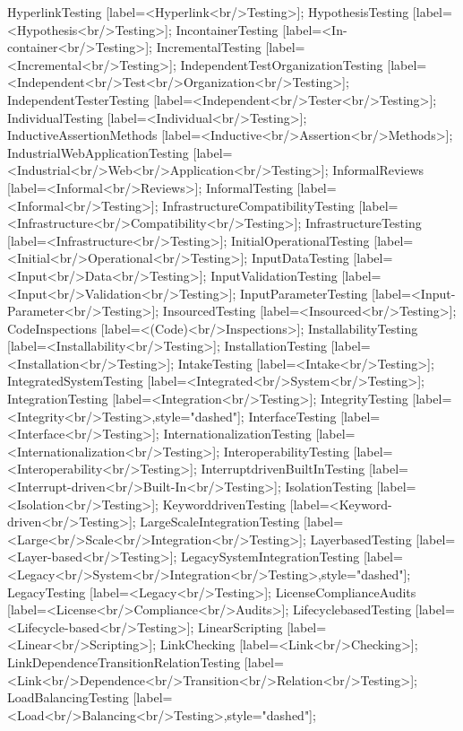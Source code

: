 \documentclass{article}
\begin{document}
{HyperlinkTesting [label=<Hyperlink<br/>Testing>];
HypothesisTesting [label=<Hypothesis<br/>Testing>];
IncontainerTesting [label=<In-container<br/>Testing>];
IncrementalTesting [label=<Incremental<br/>Testing>];
IndependentTestOrganizationTesting [label=<Independent<br/>Test<br/>Organization<br/>Testing>];
IndependentTesterTesting [label=<Independent<br/>Tester<br/>Testing>];
IndividualTesting [label=<Individual<br/>Testing>];
InductiveAssertionMethods [label=<Inductive<br/>Assertion<br/>Methods>];
IndustrialWebApplicationTesting [label=<Industrial<br/>Web<br/>Application<br/>Testing>];
InformalReviews [label=<Informal<br/>Reviews>];
InformalTesting [label=<Informal<br/>Testing>];
InfrastructureCompatibilityTesting [label=<Infrastructure<br/>Compatibility<br/>Testing>];
InfrastructureTesting [label=<Infrastructure<br/>Testing>];
InitialOperationalTesting [label=<Initial<br/>Operational<br/>Testing>];
InputDataTesting [label=<Input<br/>Data<br/>Testing>];
InputValidationTesting [label=<Input<br/>Validation<br/>Testing>];
InputParameterTesting [label=<Input-Parameter<br/>Testing>];
InsourcedTesting [label=<Insourced<br/>Testing>];
CodeInspections [label=<(Code)<br/>Inspections>];
InstallabilityTesting [label=<Installability<br/>Testing>];
InstallationTesting [label=<Installation<br/>Testing>];
IntakeTesting [label=<Intake<br/>Testing>];
IntegratedSystemTesting [label=<Integrated<br/>System<br/>Testing>];
IntegrationTesting [label=<Integration<br/>Testing>];
IntegrityTesting [label=<Integrity<br/>Testing>,style="dashed"];
InterfaceTesting [label=<Interface<br/>Testing>];
InternationalizationTesting [label=<Internationalization<br/>Testing>];
InteroperabilityTesting [label=<Interoperability<br/>Testing>];
InterruptdrivenBuiltInTesting [label=<Interrupt-driven<br/>Built-In<br/>Testing>];
IsolationTesting [label=<Isolation<br/>Testing>];
KeyworddrivenTesting [label=<Keyword-driven<br/>Testing>];
LargeScaleIntegrationTesting [label=<Large<br/>Scale<br/>Integration<br/>Testing>];
LayerbasedTesting [label=<Layer-based<br/>Testing>];
LegacySystemIntegrationTesting [label=<Legacy<br/>System<br/>Integration<br/>Testing>,style="dashed"];
LegacyTesting [label=<Legacy<br/>Testing>];
LicenseComplianceAudits [label=<License<br/>Compliance<br/>Audits>];
LifecyclebasedTesting [label=<Lifecycle-based<br/>Testing>];
LinearScripting [label=<Linear<br/>Scripting>];
LinkChecking [label=<Link<br/>Checking>];
LinkDependenceTransitionRelationTesting [label=<Link<br/>Dependence<br/>Transition<br/>Relation<br/>Testing>];
LoadBalancingTesting [label=<Load<br/>Balancing<br/>Testing>,style="dashed"];
}
\end{document}
